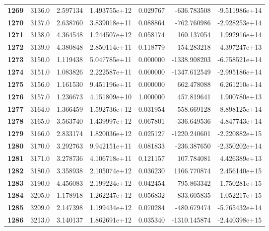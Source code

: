\documentclass{report}[12pt]
\begin{document}
\begin{center}
\begin{tabular}{lrrrrrr}
\textbf{1269} &         3136.0 &   2.597134 &  1.493755e+12 &    0.029767 &  -636.783508 & -9.511986e+14 \\
\textbf{1270} &         3137.0 &   2.638760 &  3.839018e+11 &    0.088864 &  -762.760986 & -2.928253e+14 \\
\textbf{1271} &         3138.0 &   4.364548 &  1.244507e+12 &    0.058174 &   160.137054 &  1.992916e+14 \\
\textbf{1272} &         3139.0 &   4.380848 &  2.850114e+11 &    0.118779 &   154.283218 &  4.397247e+13 \\
\textbf{1273} &         3150.0 &   1.119438 &  5.047785e+11 &    0.000000 & -1338.908203 & -6.758521e+14 \\
\textbf{1274} &         3151.0 &   1.083826 &  2.222587e+11 &    0.000000 & -1347.612549 & -2.995186e+14 \\
\textbf{1275} &         3156.0 &   1.161530 &  9.451196e+11 &    0.000000 &   662.478088 &  6.261210e+14 \\
\textbf{1276} &         3157.0 &   1.236673 &  4.151809e+10 &    1.000000 &   457.819641 &  1.900780e+13 \\
\textbf{1277} &         3164.0 &   1.366459 &  1.592736e+12 &    0.031954 &  -558.669128 & -8.898125e+14 \\
\textbf{1278} &         3165.0 &   3.563740 &  1.439997e+12 &    0.067801 &  -336.649536 & -4.847743e+14 \\
\textbf{1279} &         3166.0 &   2.833174 &  1.820036e+12 &    0.025127 & -1220.240601 & -2.220882e+15 \\
\textbf{1280} &         3170.0 &   3.292763 &  9.942151e+11 &    0.081833 &  -236.387650 & -2.350202e+14 \\
\textbf{1281} &         3171.0 &   3.278736 &  4.106718e+11 &    0.121157 &   107.784081 &  4.426389e+13 \\
\textbf{1282} &         3180.0 &   3.358938 &  2.105074e+12 &    0.036230 &  1166.770874 &  2.456140e+15 \\
\textbf{1283} &         3190.0 &   4.456083 &  2.199224e+12 &    0.042454 &   795.863342 &  1.750281e+15 \\
\textbf{1284} &         3205.0 &   1.178918 &  1.262247e+12 &    0.056832 &   833.605835 &  1.052217e+15 \\
\textbf{1285} &         3209.0 &   2.147398 &  1.199434e+12 &    0.070284 &  -480.679474 & -5.765432e+14 \\
\textbf{1286} &         3213.0 &   3.140137 &  1.862691e+12 &    0.035340 & -1310.145874 & -2.440398e+15 \\

\end{tabular}
\end{center}
\end{document}
